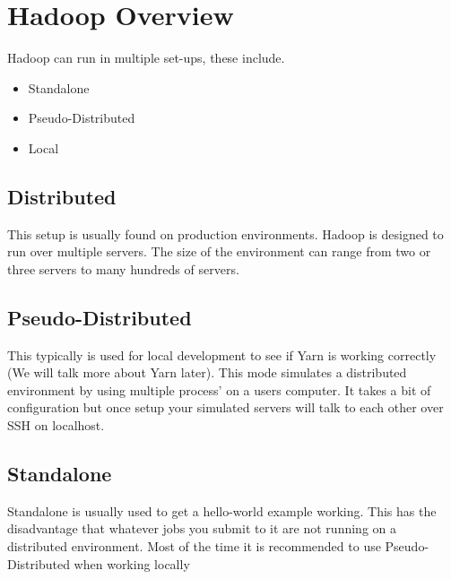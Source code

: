 \section{Hadoop Overview}

Hadoop can run in multiple set-ups, these include. 

\begin{itemize}
\item Standalone
\item Pseudo-Distributed
\item Local
\end{itemize}

\subsection{Distributed}

This setup is usually found on production environments. Hadoop is designed to run over multiple servers. The size of the environment can range from two or three servers to many hundreds of servers. 

\subsection{Pseudo-Distributed}

This typically is used for local development to see if Yarn is working correctly (We will talk more about Yarn later). This mode simulates a distributed environment by using multiple process' on a users computer. It takes a bit of configuration but once setup your simulated servers will talk to each other over SSH on localhost. 

\subsection{Standalone}

Standalone is usually used to get a hello-world example working. This has the disadvantage that whatever jobs you submit to it are not running on a distributed environment. Most of the time it is recommended to use Pseudo-Distributed when working locally

